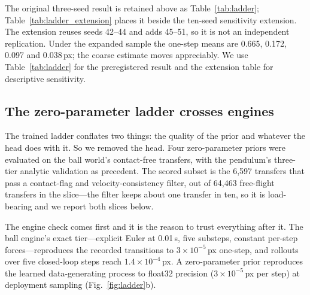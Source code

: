 \documentclass{article}
\begin{document}
The original three-seed result is retained above as Table~\ref{tab:ladder}; Table~\ref{tab:ladder_extension} places it beside the ten-seed sensitivity extension. The extension reuses seeds 42--44 and adds 45--51, so it is not an independent replication. Under the expanded sample the one-step means are 0.665, 0.172, 0.097 and 0.038\,px; the coarse estimate moves appreciably. We use Table~\ref{tab:ladder} for the preregistered result and the extension table for descriptive sensitivity.



\subsection{The zero-parameter ladder crosses engines}

The trained ladder conflates two things: the quality of the prior and whatever the head does with it. So we removed the head. Four zero-parameter priors were evaluated on the ball world's contact-free transfers, with the pendulum's three-tier analytic validation as precedent. The scored subset is the 6{,}597 transfers that pass a contact-flag and velocity-consistency filter, out of 64{,}463 free-flight transfers in the slice---the filter keeps about one transfer in ten, so it is load-bearing and we report both slices below.

The engine check comes first and it is the reason to trust everything after it. The ball engine's exact tier---explicit Euler at 0.01\,s, five substeps, constant per-step forces---reproduces the recorded transitions to $3{\times}10^{-5}$\,px one-step, and rollouts over five closed-loop steps reach $1.4{\times}10^{-4}$\,px. A zero-parameter prior reproduces the learned data-generating process to float32 precision ($3\times10^{-5}$\,px per step) at deployment sampling (Fig.~\ref{fig:ladder}b).
\end{document}
